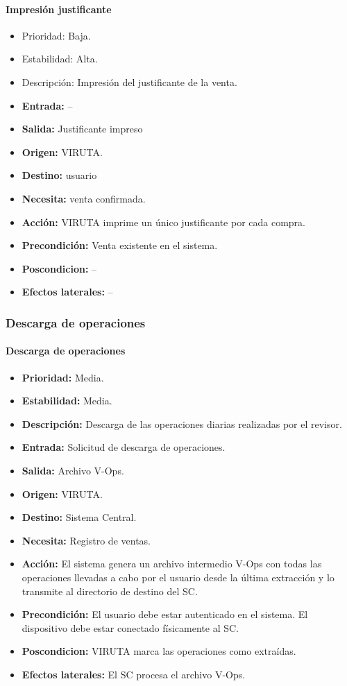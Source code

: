 \paragraph{Impresión justificante}

\begin{itemize}
\item Prioridad: Baja.
\item Estabilidad: Alta.
\item Descripción: Impresión del justificante de la venta.
\item \textbf{Entrada:} --
\item\textbf{ Salida:} Justificante impreso
\item  \textbf{Origen:} VIRUTA.
\item \textbf{Destino:} usuario
\item \textbf{Necesita:} venta confirmada.
\item \textbf{Acción:} VIRUTA imprime un único justificante por cada compra.
\item \textbf{Precondición:} Venta existente en el sistema.
\item \textbf{Poscondicion:} --
\item \textbf{Efectos laterales:} --
\end{itemize}

\subsubsection{Descarga de operaciones}

\paragraph{Descarga de operaciones}

\begin{itemize}
\item \textbf{Prioridad:} Media.
\item \textbf{Estabilidad:} Media.
\item \textbf{Descripción:} Descarga de las operaciones diarias realizadas por el revisor.
\item \textbf{Entrada:} Solicitud de descarga de operaciones.
\item \textbf{Salida:} Archivo V-Ops.
\item \textbf{Origen:} VIRUTA.
\item \textbf{Destino:} Sistema Central.
\item \textbf{Necesita:} Registro de ventas.
\item \textbf{Acción:} El sistema genera un archivo intermedio V-Ops con todas las operaciones llevadas a cabo por el usuario desde la última extracción y lo transmite al directorio de destino del SC.
\item \textbf{Precondición:} El usuario debe estar autenticado en el sistema. El dispositivo debe estar conectado físicamente al SC.
\item \textbf{Poscondicion:} VIRUTA marca las operaciones como extraídas.
\item \textbf{Efectos laterales:} El SC procesa el archivo V-Ops.
\end{itemize}

